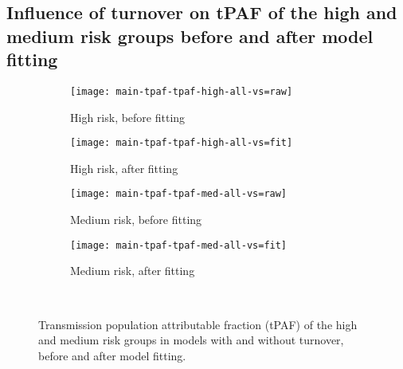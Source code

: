 \subsection{Influence of turnover on tPAF of the high and medium risk groups before and after model fitting}
\begin{figure}[H]
  \begingroup\centering
  \begin{subfigure}{0.4\linewidth}
    \texttt{[image: main-tpaf-tpaf-high-all-vs=raw]}
    \caption{High risk, before fitting}
    \label{fig:tpaf-high-raw}
  \end{subfigure}
  \begin{subfigure}{0.4\linewidth}
    \texttt{[image: main-tpaf-tpaf-high-all-vs=fit]}
    \caption{High risk, after fitting}
    \label{fig:tpaf-high-fit}
  \end{subfigure}
  \begin{subfigure}{0.4\linewidth}
    \texttt{[image: main-tpaf-tpaf-med-all-vs=raw]}
    \caption{Medium risk, before fitting}
    \label{fig:tpaf-med-raw}
  \end{subfigure}
  \begin{subfigure}{0.4\linewidth}
    \texttt{[image: main-tpaf-tpaf-med-all-vs=fit]}
    \caption{Medium risk, after fitting}
    \label{fig:tpaf-med-fit}
  \end{subfigure}
  \\\endgroup
  \caption{Transmission population attributable fraction (tPAF)
    of the high and medium risk groups in models with and without turnover,
    before and after model fitting.}
\end{figure}
